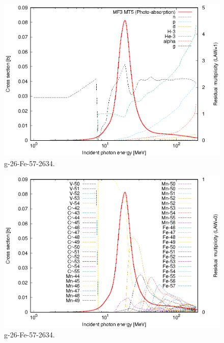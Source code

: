 \begin{figure}
 \includegraphics[width=\linewidth]{eps/g_26-Fe-57_2634.eps}
  \caption{g-26-Fe-57-2634.}
\end{figure}
\begin{figure}
 \includegraphics[width=\linewidth]{eps-law0/g_26-Fe-57_2634.eps}
 \caption{g-26-Fe-57-2634.}
\end{figure}
\newpage \clearpage

